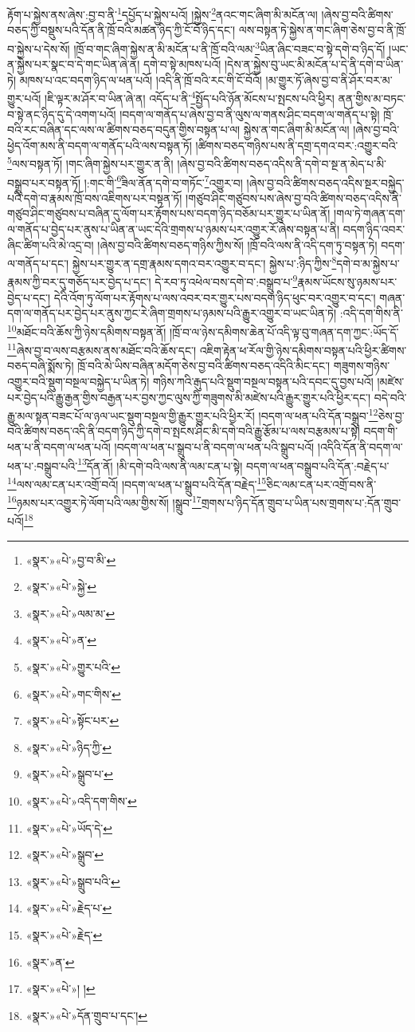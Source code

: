 རྟོག་པ་སྐྱེས་ནས་ཞེས་:བྱ་བ་ནི་\footnote{«སྣར་»«པེ་»བྱ་བ་མི་}དཔྱོད་པ་སྐྱེས་པའོ། །སྐྱེས་\footnote{«སྣར་»«པེ་»སྐྱེ་}ནའང་གང་ཞིག་མི་མངོན་ལ། །ཞེས་བྱ་བའི་ཚིགས་བཅད་ཀྱི་བསྡུས་པའི་དོན་ནི་ཁྲོ་བའི་མཚན་ཉིད་ཀྱི་ངོ་བོ་ཉིད་དང་། ལས་བསྟན་ཏེ་སྐྱེས་ན་གང་ཞིག་ཅེས་བྱ་བ་ནི་ཁྲོ་བ་སྐྱེས་པ་དེས་སོ། །ཁྲོ་བ་གང་ཞིག་སྐྱེས་ན་མི་མངོན་པ་ནི་ཁྲོ་བའི་ལམ་\footnote{«སྣར་»«པེ་»ལམ་མ་}ཡིན་ཞིང་བཟང་བ་སྟེ་དགེ་བ་ཉིད་དོ། །ཡང་ན་སྐྱེས་པར་སྣང་བ་དེ་གང་ཡིན་ཞེ་ན། དགེ་བ་སྟེ་མཁས་པའོ། །དེས་ན་སྐྱེས་བུ་ཡང་མི་མངོན་པ་དེ་ནི་དགེ་བ་ཡིན་ཏེ། མཁས་པ་འང་བདག་ཉིད་ལ་ཕན་པའོ། །འདི་ནི་ཁྲོ་བའི་རང་གི་ངོ་བོའོ། །མ་གྱུར་ཏོ་ཞེས་བྱ་བ་ནི་ཤོར་བར་མ་གྱུར་པའོ། །ཇི་ལྟར་མ་ཤོར་བ་ཡིན་ཞེ་ན། འདོད་པ་ནི་\footnote{«སྣར་»«པེ་»ན་}སྤྱོད་པའི་ཉོན་མོངས་པ་སྤངས་པའི་ཕྱིར། ནན་གྱིས་མ་བཏང་བ་སྟེ་ནང་ཉིད་དུ་དེ་འགག་པའོ། །བདག་ལ་གནོད་པ་ཞེས་བྱ་བ་ནི་ལུས་ལ་གནས་ཤིང་བདག་ལ་གནོད་པ་སྟེ། ཁྲོ་བའི་རང་བཞིན་དང་ལས་ལ་ཚིགས་བཅད་བདུན་གྱིས་བསྟན་པ་ལ། སྐྱེས་ན་གང་ཞིག་མི་མངོན་ལ། །ཞེས་བྱ་བའི་ཕྱེད་འོག་མས་ནི་བདག་ལ་གནོད་པའི་ལས་བསྟན་ཏོ། །ཚིགས་བཅད་གཉིས་པས་ནི་དགྲ་དགའ་བར་:འགྱུར་བའི་\footnote{«སྣར་»«པེ་»གྱུར་པའི་}ལས་བསྟན་ཏོ། །གང་ཞིག་སྐྱེས་པར་གྱུར་ན་ནི། །ཞེས་བྱ་བའི་ཚིགས་བཅད་འདིས་ནི་དགེ་བ་སྔ་ན་མེད་པ་མི་བསྒྲུབ་པར་བསྟན་ཏོ། །:གང་གི་\footnote{«སྣར་»«པེ་»གང་གིས་}ཟིལ་ནོན་དགེ་བ་གཏོང་\footnote{«སྣར་»«པེ་»སྟོང་པར་}འགྱུར་བ། །ཞེས་བྱ་བའི་ཚིགས་བཅད་འདིས་སྔར་བསྐྱེད་པའི་དགེ་བ་རྣམས་ཁྲོ་བས་འཇིགས་པར་བསྟན་ཏོ། །གཙུབ་ཤིང་གཙུབས་པས་ཞེས་བྱ་བའི་ཚིགས་བཅད་འདིས་ནི་གཙུབ་ཤིང་གཙུབས་པ་བཞིན་དུ་ལོག་པར་རྟོགས་པས་བདག་ཉིད་བཅོམ་པར་གྱུར་པ་ཡིན་ནོ། །གལ་ཏེ་གཞན་དག་ལ་གནོད་པ་བྱེད་པར་ནུས་པ་ཡིན་ན་ཡང་དེའི་གྲགས་པ་ཉམས་པར་འགྱུར་རོ་ཞེས་བསྟན་པ་ནི། བདག་ཉིད་འབར་ཞིང་ཚིག་པའི་མེ་འདྲ་བ། །ཞེས་བྱ་བའི་ཚིགས་བཅད་གཉིས་ཀྱིས་སོ། །ཁྲོ་བའི་ལས་ནི་འདི་དག་ཏུ་བསྟན་ཏེ། བདག་ལ་གནོད་པ་དང་། སྐྱེས་པར་གྱུར་ན་དགྲ་རྣམས་དགའ་བར་འགྱུར་བ་དང་། སྐྱེས་པ་:ཉིད་ཀྱིས་\footnote{«སྣར་»«པེ་»ཉིད་ཀྱི་}དགེ་བ་མ་སྐྱེས་པ་རྣམས་ཀྱི་བར་དུ་གཅོད་པར་བྱེད་པ་དང་། དེ་རབ་ཏུ་འཕེལ་བས་དགེ་བ་:བསྒྲུབ་པ་\footnote{«སྣར་»«པེ་»སྒྲུབ་པ་}རྣམས་ཡོངས་སུ་ཉམས་པར་བྱེད་པ་དང་། དེའི་འོག་ཏུ་ལོག་པར་རྟོགས་པ་ལས་འབར་བར་གྱུར་པས་བདག་ཉིད་ཕུང་བར་འགྱུར་བ་དང་། གཞན་དག་ལ་གནོད་པར་བྱེད་པར་ནུས་ཀྱང་རེ་ཞིག་གྲགས་པ་ཉམས་པའི་རྒྱུར་འགྱུར་བ་ཡང་ཡིན་ཏེ། :འདི་དག་གིས་ནི་\footnote{«སྣར་»«པེ་»འདི་དག་གིས་}མཐོང་བའི་ཆོས་ཀྱི་ཉེས་དམིགས་བསྟན་ནོ། །ཁྲོ་བ་ལ་ཉེས་དམིགས་ཆེན་པོ་འདི་ལྟ་བུ་གཞན་དག་ཀྱང་:ཡོད་དོ་\footnote{«སྣར་»«པེ་»ཡོད་དེ་}ཞེས་བྱ་བ་ལས་བརྩམས་ནས་མཐོང་བའི་ཆོས་དང་། འཇིག་རྟེན་ཕ་རོལ་གྱི་ཉེས་དམིགས་བསྟན་པའི་ཕྱིར་ཚིགས་བཅད་བཞི་སྨོས་ཏེ། ཁྲོ་བའི་མེ་ཡིས་བཞིན་མདོག་ཅེས་བྱ་བའི་ཚིགས་བཅད་འདིའི་མིང་དང་། གཟུགས་གཉིས་འགྱུར་བའི་སྡུག་བསྔལ་བསྐྱེད་པ་ཡིན་ཏེ། གཉིས་ཀའི་རྒུད་པའི་སྡུག་བསྔལ་བསྟན་པའི་དབང་དུ་བྱས་པའོ། །མཛེས་པར་བྱེད་པའི་རྒྱུ་རྒྱན་གྱིས་བརྒྱན་པར་བྱས་ཀྱང་ལུས་ཀྱི་གཟུགས་མི་མཛེས་པའི་རྒྱུར་གྱུར་པའི་ཕྱིར་དང་། བདེ་བའི་རྒྱུ་མལ་སྟན་བཟང་པོ་ལ་ཉལ་ཡང་སྡུག་བསྔལ་གྱི་རྒྱུར་གྱུར་པའི་ཕྱིར་རོ། །བདག་ལ་ཕན་པའི་དོན་བསྒྲུབ་\footnote{«སྣར་»«པེ་»སྒྲུབ་}ཅེས་བྱ་བའི་ཚིགས་བཅད་འདི་ནི་བདག་ཉིད་ཀྱི་དགེ་བ་སྤངས་ཤིང་མི་དགེ་བའི་རྒྱུ་རྩོམ་པ་ལས་བརྩམས་པ་སྟེ། བདག་གི་ཕན་པ་ནི་བདག་ལ་ཕན་པའོ། །བདག་ལ་ཕན་པ་སྒྲུབ་པ་ནི་བདག་ལ་ཕན་པའི་སྒྲུབ་པའོ། །འདིའི་དོན་ནི་བདག་ལ་ཕན་པ་:བསྒྲུབ་པའི་\footnote{«སྣར་»«པེ་»སྒྲུབ་པའི་}དོན་ནོ། །མི་དགེ་བའི་ལས་ནི་ལམ་ངན་པ་སྟེ། བདག་ལ་ཕན་བསྒྲུབ་པའི་དོན་:བརྗེད་པ་\footnote{«སྣར་»«པེ་»རྗེད་པ་}ལས་ལམ་ངན་པར་འགྲོ་བའོ། །བདག་ལ་ཕན་པ་སྒྲུབ་པའི་དོན་བརྗེད་\footnote{«སྣར་»«པེ་»རྗེད་}ཅིང་ལམ་ངན་པར་འགྲོ་བས་ནི་\footnote{«སྣར་»ན་}ཉམས་པར་འགྱུར་ཏེ་ལོག་པའི་ལམ་གྱིས་སོ། །སྒྲུབ་\footnote{«སྣར་»«པེ་»། །}གྲགས་པ་ཉིད་དོན་གྲུབ་པ་ཡིན་པས་གྲགས་པ་:དོན་གྲུབ་པའོ།\footnote{«སྣར་»«པེ་»དོན་གྲུབ་པ་དང་།} 